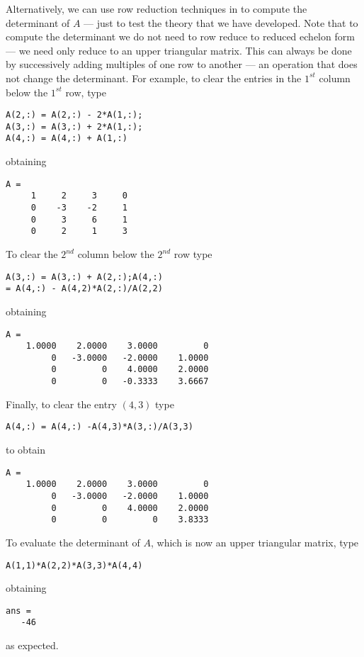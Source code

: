 \documentclass{ximera}
\begin{document}
Alternatively, we can use row reduction techniques in \Matlab to
compute the determinant of $A$ --- just to test the theory that
we have developed.  Note that to compute the determinant we do
not need to row reduce to 
reduced echelon form --- we need only
reduce to an upper triangular matrix.  This can always be done
by successively adding multiples of one row to another --- an
operation that does not change the determinant.  For example,
to clear the entries in the $1^{st}$ column below the $1^{st}$
row, type
\begin{verbatim}
A(2,:) = A(2,:) - 2*A(1,:);
A(3,:) = A(3,:) + 2*A(1,:); 
A(4,:) = A(4,:) + A(1,:)
\end{verbatim}
obtaining 
\begin{verbatim}
A =
     1     2     3     0
     0    -3    -2     1
     0     3     6     1
     0     2     1     3
\end{verbatim}
To clear the $2^{nd}$ column below the $2^{nd}$ row type 
\begin{verbatim}
A(3,:) = A(3,:) + A(2,:);A(4,:)
= A(4,:) - A(4,2)*A(2,:)/A(2,2)\end{verbatim}
obtaining
\begin{verbatim}
A =
    1.0000    2.0000    3.0000         0
         0   -3.0000   -2.0000    1.0000
         0         0    4.0000    2.0000
         0         0   -0.3333    3.6667
\end{verbatim}
Finally, to clear the entry $(4,3)$ type
\begin{verbatim}
A(4,:) = A(4,:) -A(4,3)*A(3,:)/A(3,3)\end{verbatim}
to obtain
\begin{verbatim}
A =
    1.0000    2.0000    3.0000         0
         0   -3.0000   -2.0000    1.0000
         0         0    4.0000    2.0000
         0         0         0    3.8333
\end{verbatim}
To evaluate the determinant of $A$, which is now an upper
triangular matrix, type
\begin{verbatim}
A(1,1)*A(2,2)*A(3,3)*A(4,4)\end{verbatim}
obtaining
\begin{verbatim}
ans =
   -46
\end{verbatim}
as expected.

\EXER

\TEXER
\end{document}
